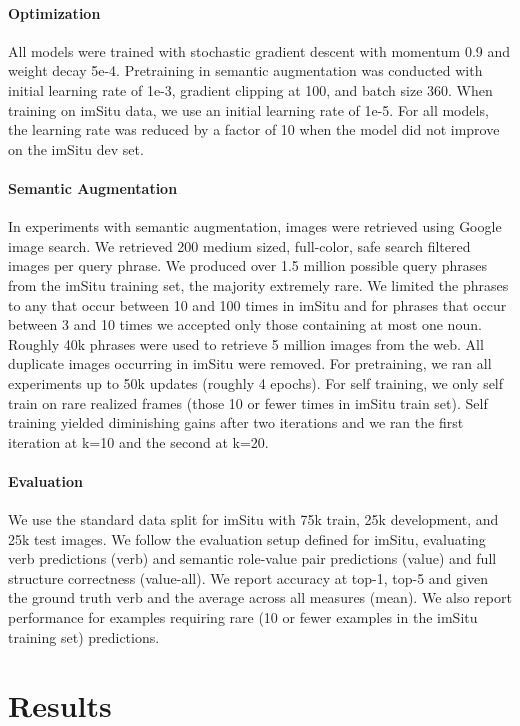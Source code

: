 \documentclass[10pt,twocolumn,letterpaper]{article}
\begin{document}
 
\paragraph{Optimization}
All models were trained with stochastic gradient descent with momentum 0.9 and weight decay 5e-4. 
Pretraining in semantic augmentation was conducted with initial learning rate of 1e-3, gradient clipping at 100, and batch size 360. 
When training on imSitu data, we use an initial learning rate of 1e-5. 
For all models, the learning rate was reduced by a factor of 10 when the model did not improve on the imSitu dev set. 


\paragraph{Semantic Augmentation}
In experiments with semantic augmentation, images were retrieved using Google image search. 
We retrieved 200 medium sized, full-color, safe search filtered images per query phrase.
We produced over 1.5 million possible query phrases from the imSitu training set, the majority extremely rare.
We limited the phrases to any that occur between 10 and 100 times in imSitu and for phrases that occur between 3 and 10 times we accepted only those containing at most one noun.
Roughly 40k phrases were used to retrieve 5 million images from the web.
All duplicate images occurring in imSitu were removed.
For pretraining, we ran all experiments up to 50k updates (roughly 4 epochs). 
For self training, we only self train on rare realized frames (those 10 or fewer times in imSitu train set). 
Self training yielded diminishing gains after two iterations and we ran the first iteration at k=10 and the second at k=20.   


\paragraph{Evaluation} 
We use the standard data split for imSitu\cite{yatskar2016} with 75k train, 25k development, and 25k test images.
We follow the evaluation setup defined for imSitu, evaluating verb predictions (verb) and semantic role-value pair predictions (value) and full structure correctness (value-all). 
We report accuracy at top-1, top-5 and given the ground truth verb and the average across all measures (mean). 
We also report performance for examples requiring rare (10 or fewer examples in the imSitu training set) predictions. 
 \section{Results}
\label{sec:results}
\end{document}
